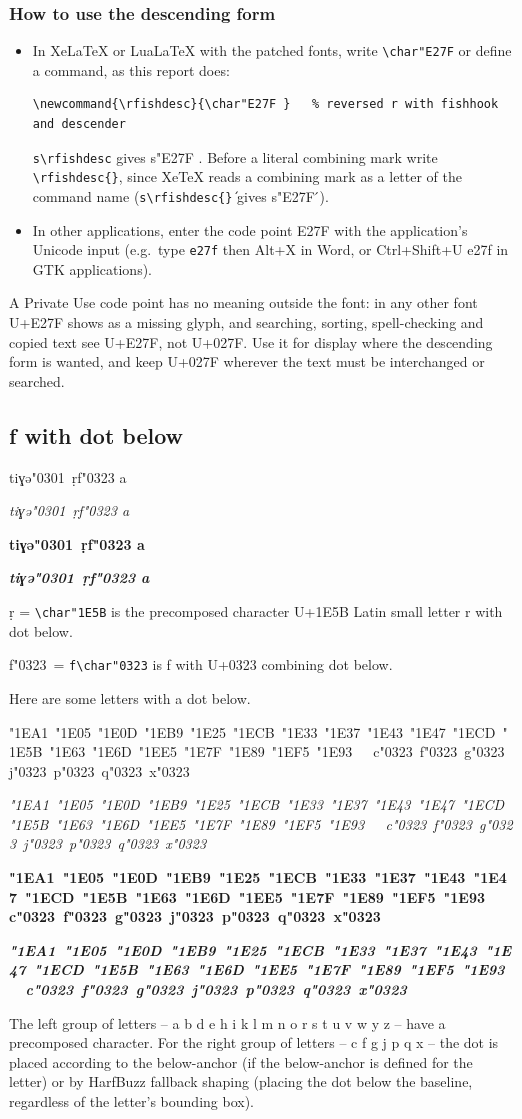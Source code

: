 \documentclass[landscape]{article}
\newcommand{\ribbi}[1]{#1\
	
	{\itshape #1}
	
	{\bfseries #1}
	
	{\itshape\bfseries #1}}
\newcommand{\rfishdesc}{\char"E27F }
\begin{document}
\subsubsection*{How to use the descending form}
\begin{itemize}
\item In XeLaTeX or LuaLaTeX with the patched fonts, write \verb|\char"E27F| or define a command, as this report does:
\begin{verbatim}
\newcommand{\rfishdesc}{\char"E27F }   % reversed r with fishhook and descender
\end{verbatim}
\verb|s\rfishdesc| gives {\LibertinusSerifPatch s\rfishdesc}.
Before a literal combining mark write \verb|\rfishdesc{}|, since XeTeX reads a combining mark as a letter of the command name (\verb|s\rfishdesc{}́| gives {\LibertinusSerifPatch s\rfishdesc{}́}).
\item In other applications, enter the code point E27F with the application's Unicode input (e.g.\ type \verb|e27f| then Alt+X in Word, or Ctrl+Shift+U e27f in GTK applications).
\end{itemize}
A Private Use code point has no meaning outside the font: in any other font U+E27F shows as a missing glyph, and searching, sorting, spell-checking and copied text see U+E27F, not U+027F.
Use it for display where the descending form is wanted, and keep U+027F wherever the text must be interchanged or searched.

\subsection*{f with dot below}

\ribbi{tiɣə\char"0301\ ṛf\char"0323 a}

ṛ = \verb|\char"1E5B| is the precomposed character U+1E5B Latin small letter r with dot below.

f\char"0323\ = \verb|f\char"0323| is f with U+0323 combining dot below.

Here are some letters with a dot below.

\ribbi{
	\char"1EA1\ \char"1E05\ \char"1E0D\ \char"1EB9\ \char"1E25\ \char"1ECB\ \char"1E33\ \char"1E37\ \char"1E43\ \char"1E47\ \char"1ECD\ \char"1E5B\ \char"1E63\ \char"1E6D\ \char"1EE5\ \char"1E7F\ \char"1E89\ \char"1EF5\ \char"1E93\
	\ \ c\char"0323\ f\char"0323\ g\char"0323\ j\char"0323\ p\char"0323\ q\char"0323\ 
	x\char"0323}

The left group of letters -- a b d e h i k l m n o r s t u v w y z -- have a precomposed character.
For the right group of letters -- c f g j p q x -- the dot is placed according to the below-anchor (if the below-anchor is defined for the letter) or by HarfBuzz fallback shaping (placing the dot below the baseline, regardless of the letter's bounding box).
\end{document}
